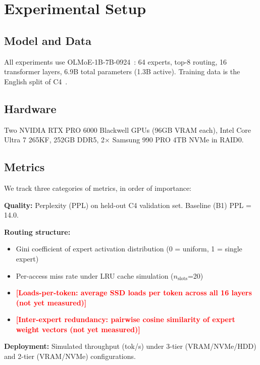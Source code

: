 \documentclass{article}
\newcommand{\placeholder}[1]{\textcolor{red}{\textbf{[#1]}}}
\begin{document}
\section{Experimental Setup}

\subsection{Model and Data}
All experiments use OLMoE-1B-7B-0924~\cite{muennighoff2024olmoe}: 64 experts, top-8 routing, 16 transformer layers, 6.9B total parameters (1.3B active). Training data is the English split of C4~\cite{raffel2020c4}.

\subsection{Hardware}
Two NVIDIA RTX PRO 6000 Blackwell GPUs (96GB VRAM each), Intel Core Ultra 7 265KF, 252GB DDR5, 2$\times$ Samsung 990 PRO 4TB NVMe in RAID0.

\subsection{Metrics}

We track three categories of metrics, in order of importance:

\textbf{Quality:} Perplexity (PPL) on held-out C4 validation set. Baseline (B1) PPL = 14.0.

\textbf{Routing structure:}
\begin{itemize}
    \item Gini coefficient of expert activation distribution (0 = uniform, 1 = single expert)
    \item Per-access miss rate under LRU cache simulation ($n_{\text{slots}}$=20)
    \item \placeholder{Loads-per-token: average SSD loads per token across all 16 layers (not yet measured)}
    \item \placeholder{Inter-expert redundancy: pairwise cosine similarity of expert weight vectors (not yet measured)}
\end{itemize}

\textbf{Deployment:} Simulated throughput (tok/s) under 3-tier (VRAM/NVMe/HDD) and 2-tier (VRAM/NVMe) configurations.

\end{document}

